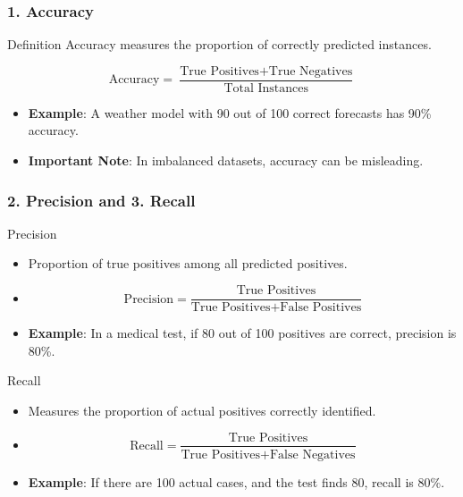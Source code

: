 \documentclass[aspectratio=169]{beamer}
\begin{document}
\begin{frame}[fragile]
    \frametitle{1. Accuracy}
    \begin{block}{Definition}
        Accuracy measures the proportion of correctly predicted instances.
    \end{block}
    \begin{equation}
        \text{Accuracy} = \frac{\text{True Positives} + \text{True Negatives}}{\text{Total Instances}}
    \end{equation}
    \begin{itemize}
        \item \textbf{Example}: A weather model with 90 out of 100 correct forecasts has 90\% accuracy.
        \item \textbf{Important Note}: In imbalanced datasets, accuracy can be misleading.
    \end{itemize}
\end{frame}

\begin{frame}[fragile]
    \frametitle{2. Precision and 3. Recall}
    \begin{block}{Precision}
        \begin{itemize}
            \item Proportion of true positives among all predicted positives.
            \item \[
            \text{Precision} = \frac{\text{True Positives}}{\text{True Positives} + \text{False Positives}}
            \]
            \item \textbf{Example}: In a medical test, if 80 out of 100 positives are correct, precision is 80\%.
        \end{itemize}
    \end{block}

    \begin{block}{Recall}
        \begin{itemize}
            \item Measures the proportion of actual positives correctly identified.
            \item \[
            \text{Recall} = \frac{\text{True Positives}}{\text{True Positives} + \text{False Negatives}}
            \]
            \item \textbf{Example}: If there are 100 actual cases, and the test finds 80, recall is 80\%.
        \end{itemize}
    \end{block}
\end{frame}
\end{document}
